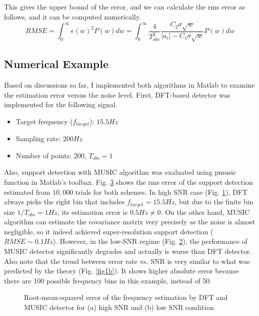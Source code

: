 \documentclass[11pt,journal, onecolumn]{IEEEtran}
\theoremstyle{theorem}
\begin{document}
This gives the upper bound of the error, and we can calculate the rms error as follows, and it can be computed numerically.
\begin{equation}
    RMSE = \int_{0}^{\infty}\epsilon(w)^2 P(w)dw =\int_{0}^{\infty} \frac{4}{T_{obs}^2} \frac{C_2 \sigma \sqrt{w}}{|a_i| - C_1 \sigma \sqrt{w} } P(w)dw 
\end{equation}


\subsection{Numerical Example}

Based on discussions so far, I implemented both algorithms in Matlab to examine the estimation error versus the noise level. First, DFT-based detector was implemented for the following signal. 

\begin{itemize}
    \item Target frequency ($f_{target}$): $15.5Hz$
    \item Sampling rate: $200Hz$
    \item Number of points: $200$, $T_{obs}=1$
\end{itemize}

Also, support detection with MUSIC algorithm was exaluated using \textsf{pmusic} function in Matlab's toolbax. Fig. \ref{figure2} shows the rms error of the support detection estimated from $10,000$ trials for both schemes. In high SNR case (Fig. \ref{figure2a}), DFT always picks the right bin that includes $f_{target}=15.5Hz$, but due to the finite bin size $1/T_{obs}=1Hz$, its estimation error is $0.5Hz \neq 0$. On the other hand, MUSIC algorithm can estimate the covariance matrix very precisely as the noise is almost negligible, so it indeed achieved super-resolution support detection ($RMSE \sim 0.1Hz$). However, in the low-SNR regime (Fig. \ref{figure2b}), the performance of MUSIC detector significantly degrades and actually is worse than DFT detector. Also note that the trend between error rate vs. SNR is very similar to what was predicted by the theory (Fig. \ref{fig1b}). It shows higher absolute error because there are 100 possible frequency bins in this example, instead of 50. 

\begin{figure}[t!]
\centering
            \begin{subfigure}[b]{0.47\columnwidth}
                \centering
		\resizebox{\columnwidth}{!}{
    \huge
    {

}
}
\caption{}
\label{figure2a}
\end{subfigure}
\hfill
            \begin{subfigure}[b]{0.47\columnwidth}
                \centering
		\resizebox{\columnwidth}{!}{
    \huge
    {

}
}
\caption{}
\label{figure2b}
\end{subfigure}
\caption{
    Root-mean-squared error of the frequency estimation by DFT and MUSIC detector for (a) high SNR and (b) low SNR condition
}
\label{figure2}
\end{figure}
\end{document}
